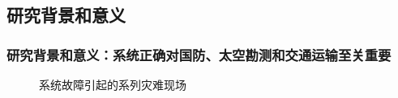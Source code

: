 \documentclass[aspectratio=1610, 9pt, CJK]{beamer}
\begin{document}
	\subsection{研究背景和意义}
	\begin{frame}  
		\frametitle{研究背景和意义：{\footnotesize 系统正确对国防、太空勘测和交通运输至关重要}}
			\begin{figure}
				\setlength{\abovecaptionskip}{0cm}  %
				\setlength{\belowcaptionskip}{-0.2cm} %
				\centering
				\qquad
			  \qquad
				\caption{系统故障引起的系列灾难现场}
			\end{figure}
		

\end{frame}
\end{document}
